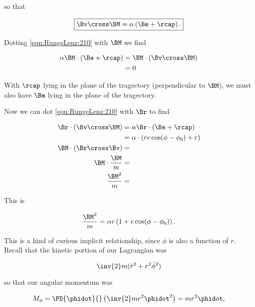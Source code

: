 so that 

\begin{equation}\label{eqn:RungeLenz:210}
\boxed{
\Bv \cross \BM = \alpha \left(\Be + \rcap \right).
}
\end{equation}

Dotting \ref{eqn:RungeLenz:210} with $\BM$ we find

\begin{align*}
\alpha \BM \cdot \left(\Be + \rcap \right)
&=
\BM \cdot (\Bv \cross \BM) \\
&= 0
\end{align*}

With $\rcap$ lying in the plane of the tragectory (perpendicular to $\BM$), we must also have $\Be$ lying in the plane of the tragectory.

Now we can dot \ref{eqn:RungeLenz:210} with $\Br$ to find

\begin{align*}
\Br \cdot (\Bv \cross \BM) 
&= \alpha \Br \cdot \left(\Be + \rcap \right) \\ 
&= \alpha \cdot \left( r e \cos(\phi - \phi_0) + r \right) \\
\BM \cdot (\Br \cross \Bv) &= \\
\BM \cdot \frac{\BM}{m} &= \\
\frac{\BM^2}{m} &=
\end{align*}

This is

\begin{equation}\label{eqn:RungeLenz:230}
\frac{\BM^2}{m} = \alpha r \left( 1 + e \cos(\phi - \phi_0) \right).
\end{equation}

This is a kind of curious implicit relationship, since $\phi$ is also a function of $r$.  Recall that the kinetic portion of our Lagrangian was

\begin{equation}\label{eqn:RungeLenz:250}
\inv{2} m (\dot{r}^2 + r^2 \dot{\phi}^2 )
\end{equation}

so that our angular momentum was

\begin{equation}\label{eqn:RungeLenz:270}
M_\phi = \PD{\phidot}{} \left( \inv{2} m r^2 \phidot^2 \right) = m r^2 \phidot,
\end{equation}


